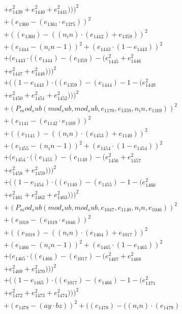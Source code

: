 \documentclass[10pt, a4paper]{article}
\begin{document}
\begin{align*}
& + e_{1439}^{2} + e_{1440}^{2} + e_{1441}^{2})))^{2} \\
& + (e_{1360} - (e_{1361}  \cdot  e_{1375}))^{2} \\
& + ((e_{1360}) - ((n_in)  \cdot  (e_{1442}) + e_{1359}))^{2} \\
& + (e_{1444} - (n_in - 1))^{2} + (e_{1443}  \cdot  (1 - e_{1443}))^{2} \\
& + (e_{1443}  \cdot  ((e_{1444}) - (e_{1359}) - (e_{1445}^{2} + e_{1446}^{2} \\
& + e_{1447}^{2} + e_{1448}^{2})))^{2} \\
& + ((1 - e_{1443})  \cdot  ((e_{1359}) - (e_{1444}) - 1 - (e_{1449}^{2} \\
& + e_{1450}^{2} + e_{1451}^{2} + e_{1452}^{2})))^{2} \\
& + (P_mod_sub(mod_sub, mod_sub, e_{1170}, e_{1359}, n_in, e_{1169}))^{2} \\
& + (e_{1141} - (e_{1142}  \cdot  e_{1169}))^{2} \\
& + ((e_{1141}) - ((n_in)  \cdot  (e_{1453}) + e_{1140}))^{2} \\
& + (e_{1455} - (n_in - 1))^{2} + (e_{1454}  \cdot  (1 - e_{1454}))^{2} \\
& + (e_{1454}  \cdot  ((e_{1455}) - (e_{1140}) - (e_{1456}^{2} + e_{1457}^{2} \\
& + e_{1458}^{2} + e_{1459}^{2})))^{2} \\
& + ((1 - e_{1454})  \cdot  ((e_{1140}) - (e_{1455}) - 1 - (e_{1460}^{2} \\
& + e_{1461}^{2} + e_{1462}^{2} + e_{1463}^{2})))^{2} \\
& + (P_mod_sub(mod_sub, mod_sub, e_{1047}, e_{1140}, n_in, e_{1046}))^{2} \\
& + (e_{1018} - (e_{1019}  \cdot  e_{1046}))^{2} \\
& + ((e_{1018}) - ((n_in)  \cdot  (e_{1464}) + e_{1017}))^{2} \\
& + (e_{1466} - (n_in - 1))^{2} + (e_{1465}  \cdot  (1 - e_{1465}))^{2} \\
& + (e_{1465}  \cdot  ((e_{1466}) - (e_{1017}) - (e_{1467}^{2} + e_{1468}^{2} \\
& + e_{1469}^{2} + e_{1470}^{2})))^{2} \\
& + ((1 - e_{1465})  \cdot  ((e_{1017}) - (e_{1466}) - 1 - (e_{1471}^{2} \\
& + e_{1472}^{2} + e_{1473}^{2} + e_{1474}^{2})))^{2} \\
& + (e_{1478} - (ay  \cdot  bz))^{2} + ((e_{1478}) - ((n_in)  \cdot  (e_{1479}) \\

\end{align*}
\end{document}
